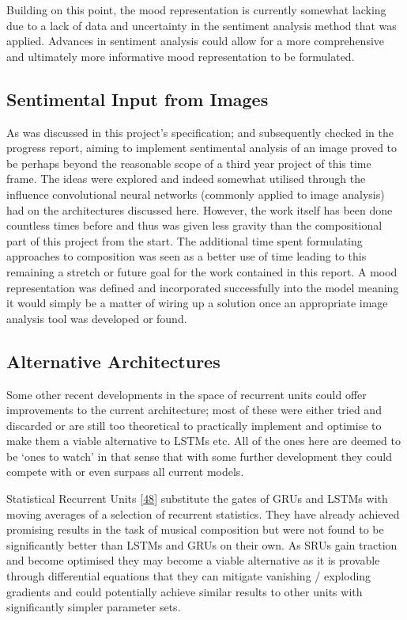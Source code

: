 \documentclass[12pt,]{article}
\begin{document}
Building on this point, the mood representation is currently somewhat
lacking due to a lack of data and uncertainty in the sentiment analysis
method that was applied. Advances in sentiment analysis could allow for
a more comprehensive and ultimately more informative mood representation
to be formulated.

\hypertarget{sentimental-input-from-images}{%
\subsection{Sentimental Input from
Images}\label{sentimental-input-from-images}}

As was discussed in this project's specification; and subsequently
checked in the progress report, aiming to implement sentimental analysis
of an image proved to be perhaps beyond the reasonable scope of a third
year project of this time frame. The ideas were explored and indeed
somewhat utilised through the influence convolutional neural networks
(commonly applied to image analysis) had on the architectures discussed
here. However, the work itself has been done countless times before and
thus was given less gravity than the compositional part of this project
from the start. The additional time spent formulating approaches to
composition was seen as a better use of time leading to this remaining a
stretch or future goal for the work contained in this report. A mood
representation was defined and incorporated successfully into the model
meaning it would simply be a matter of wiring up a solution once an
appropriate image analysis tool was developed or found.

\hypertarget{alternative-architectures}{%
\subsection{Alternative Architectures}\label{alternative-architectures}}

Some other recent developments in the space of recurrent units could
offer improvements to the current architecture; most of these were
either tried and discarded or are still too theoretical to practically
implement and optimise to make them a viable alternative to LSTMs etc.
All of the ones here are deemed to be `ones to watch' in that sense that
with some further development they could compete with or even surpass
all current models.

Statistical Recurrent Units
{[}\protect\hyperlink{ref-oliva2017statistical}{48}{]} substitute the
gates of GRUs and LSTMs with moving averages of a selection of recurrent
statistics. They have already achieved promising results in the task of
musical composition but were not found to be significantly better than
LSTMs and GRUs on their own. As SRUs gain traction and become optimised
they may become a viable alternative as it is provable through
differential equations that they can mitigate vanishing / exploding
gradients and could potentially achieve similar results to other units
with significantly simpler parameter sets.
\end{document}
